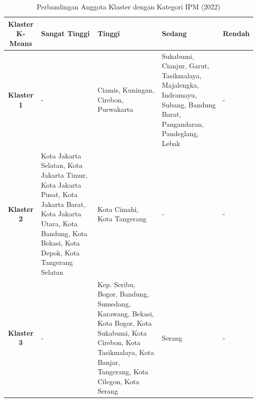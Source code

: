 \begin{table}[H]
\centering
\caption{Perbandingan Anggota Klaster dengan Kategori IPM (2022)} \label{tab:ipm_cross_2022}
\begin{tabular}{|c|p{2cm}|p{2cm}|p{2cm}|p{2cm}|}
\hline
\textbf{Klaster K-Means} & \textbf{Sangat Tinggi} & \textbf{Tinggi} & \textbf{Sedang} & \textbf{Rendah} \\ \hline
\textbf{Klaster 1} & - & Ciamis, Kuningan, Cirebon, Purwakarta & Sukabumi, Cianjur, Garut, Tasikmalaya, Majalengka, Indramayu, Subang, Bandung Barat, Pangandaran, Pandeglang, Lebak & - \\ \hline
\textbf{Klaster 2} & Kota Jakarta Selatan, Kota Jakarta Timur, Kota Jakarta Pusat, Kota Jakarta Barat, Kota Jakarta Utara, Kota Bandung, Kota Bekasi, Kota Depok, Kota Tangerang Selatan & Kota Cimahi, Kota Tangerang & - & - \\ \hline
\textbf{Klaster 3} & - & Kep. Seribu, Bogor, Bandung, Sumedang, Karawang, Bekasi, Kota Bogor, Kota Sukabumi, Kota Cirebon, Kota Tasikmalaya, Kota Banjar, Tangerang, Kota Cilegon, Kota Serang & Serang & - \\ \hline
\end{tabular}
\end{table}